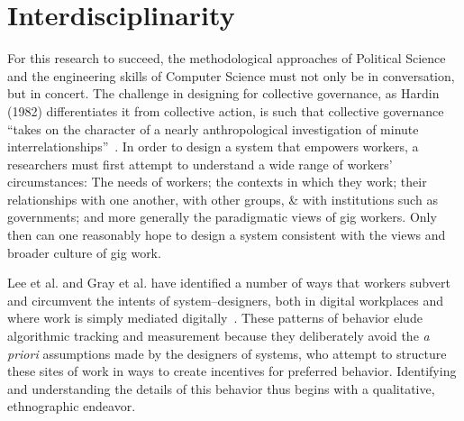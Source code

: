 \documentclass{article}
\begin{document}



\section*{Interdisciplinarity}
For this research to succeed, the methodological approaches of Political Science
and the engineering skills of Computer Science must not only be in conversation, but in concert.
The challenge in designing for collective governance,
as Hardin (1982) differentiates it from collective action,
is such that collective governance
``takes on the character of a nearly anthropological investigation of minute interrelationships''~\cite{russell1982collective}.
In order to design a system that empowers workers,
a researchers must first attempt to understand a wide range of workers' circumstances:
The needs of workers;
the contexts in which they work;
their relationships with one another, with other groups, \& with institutions such as governments;
and more generally the paradigmatic views of gig workers.
Only then can one reasonably hope to design a system consistent with the views and broader culture of gig work.

Lee et al. and Gray et al. have identified a number of ways that workers subvert and circumvent the intents of system--designers,
both in digital workplaces and where work is simply mediated digitally~\cite{uberAlgorithm,crowdcollab}.
These patterns of behavior elude algorithmic tracking and measurement because they deliberately avoid the \textit{a priori} assumptions made by the designers of systems,
who attempt to structure these sites of work in ways to create incentives for preferred behavior.
Identifying and understanding the details of this behavior thus begins with a qualitative,
ethnographic endeavor.
\end{document}
